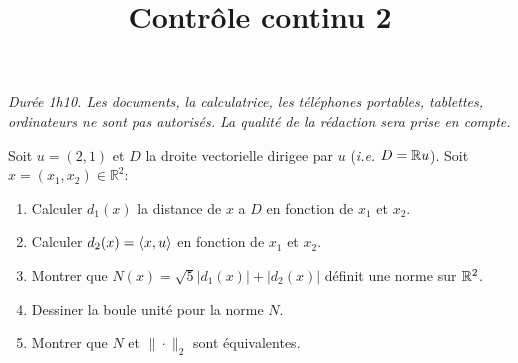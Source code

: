 \documentclass[a4paper]{tp_um}
\title{\large \sffamily\bfseries Contrôle continu 2}
\begin{document}
\maketitle
\textit{Durée 1h10. Les documents, la calculatrice, les téléphones portables, tablettes, ordinateurs ne sont pas autorisés. La qualité de la rédaction sera prise en compte.} 

\bigskip
\bigskip

\exo{} Soit $u = (2,1)$ et $D$ la droite vectorielle dirigee par $u$ (\textit{i.e.} $D = \mathbb{R} u$). Soit $x = (x_1,x_2) \in \mathbb R^2$:

\begin{enumerate}
    \item Calculer $d_1(x)$ la distance de $x$ a $D$ en fonction de $x_1$ et $x_2$. 
        \blanc{4cm}
        
    \item Calculer $d_2(x) = \left\langle x,u\right\rangle$ en fonction de $x_1$ et $x_2$.

        \blanc{4cm}

    \item Montrer que $N(x) = \sqrt{5}|d_1(x)| + |d_2(x)| $ définit une norme sur $\mathbb{R}^2$.

        \blanc{8cm} \pagebreak
    \item  Dessiner la boule unité pour la norme $N$.
        \begin{center}
        \end{center}
        
        \item Montrer que $N$ et $\|\cdot\|_2$ sont \'equivalentes.
         \blanc{6cm}
       
\end{enumerate}
\end{document}
